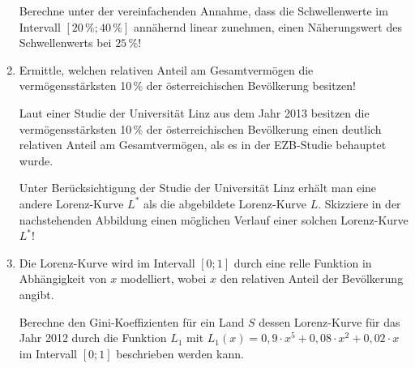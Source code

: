 \begin{langesbeispiel}
\begin{enumerate}
	Berechne unter der vereinfachenden Annahme, dass die Schwellenwerte im Intervall $[20\,\%; 40\,\%]$ annähernd linear zunehmen, einen Näherungswert des Schwellenwerts bei $25\,\%$!
	
	\item Ermittle, welchen relativen Anteil am Gesamtvermögen die vermögensstärksten 10\,\% der österreichischen Bevölkerung besitzen!
	
	Laut einer Studie der Universität Linz aus dem Jahr 2013 besitzen die vermögensstärksten 10\,\% der österreichischen Bevölkerung einen deutlich relativen Anteil am Gesamtvermögen, als es in der EZB-Studie behauptet wurde.
	
	Unter Berücksichtigung der Studie der Universität Linz erhält man eine andere Lorenz-Kurve $L^*$ als die abgebildete Lorenz-Kurve $L$. Skizziere in der nachstehenden Abbildung einen möglichen Verlauf einer solchen Lorenz-Kurve $L^*$!
	
	\begin{center}
	\end{center}
	
	\item Die Lorenz-Kurve wird im Intervall $[0;1]$ durch eine relle Funktion in Abhängigkeit von $x$ modelliert, wobei $x$ den relativen Anteil der Bevölkerung angibt.
	
	Berechne den Gini-Koeffizienten für ein Land $S$ dessen Lorenz-Kurve für das Jahr 2012 durch die Funktion $L_1$ mit $L_1(x)=0,9\cdot x^5+0,08\cdot x^2+0,02\cdot x$ im Intervall $[0;1]$ beschrieben werden kann.
	

\end{enumerate}
\end{langesbeispiel}
